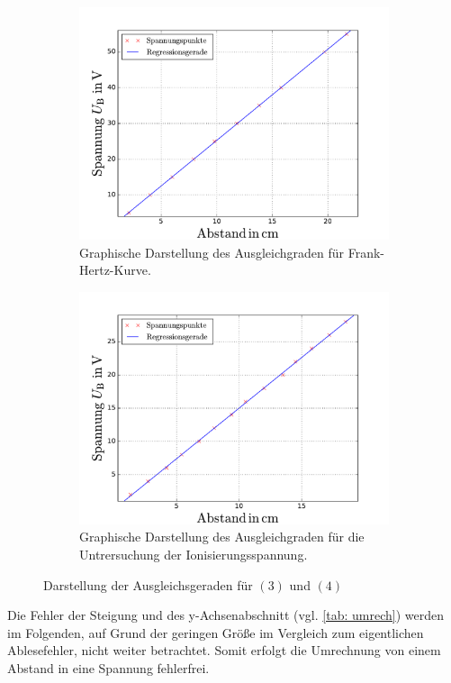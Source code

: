\begin{figure}
  \centering
  \begin{subfigure}{0.48\textwidth}
    \centering
    \includegraphics[width=1 \textwidth]{../Messdaten/frank_hertz_kuvre.pdf}
    \caption{Graphische Darstellung des Ausgleichgraden für Frank-Hertz-Kurve.}
    \label{fig: frank_hertz}
  \end{subfigure}
  \begin{subfigure}{0.48\textwidth}
    \centering
    \includegraphics[width=1 \textwidth]{../Messdaten/ioni.pdf}
    \caption{Graphische Darstellung des Ausgleichgraden für die Untrersuchung der Ionisierungsspannung.}
    \label{fig: enrgie_hot}
  \end{subfigure}
  \caption{Darstellung der Ausgleichsgeraden für $(3)$ und $(4)$}
  \label{fig: darstellung_2}
\end{figure}
Die Fehler der Steigung und des y-Achsenabschnitt (vgl. \ref{tab: umrech}) werden
im Folgenden, auf Grund der geringen Größe im Vergleich zum eigentlichen Ablesefehler, nicht weiter betrachtet.
Somit erfolgt die Umrechnung von einem Abstand in eine Spannung
fehlerfrei.
\FloatBarrier

